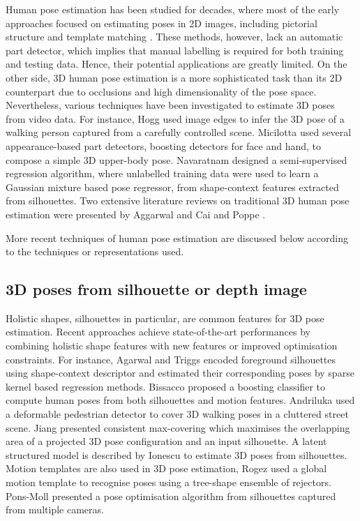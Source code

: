 Human pose estimation has been studied for decades, where most of the early approaches focused on estimating poses in 2D images, including pictorial structure \cite{Fischler1973} and template matching \cite{Ioffe1999}. These methods, however, lack an automatic part detector, which implies that manual labelling is required for both training and testing data. Hence, their potential applications are greatly limited.
On the other side, 3D human pose estimation is a more sophisticated task than its 2D counterpart due to occlusions and high dimensionality of the pose space. Nevertheless, various techniques have been investigated to estimate 3D poses from video data. For instance, Hogg \cite{Hogg1983} used image edges to infer the 3D pose of a walking person captured from a carefully controlled scene. 
Micilotta \etal \cite{Micilotta2006} used several appearance-based part detectors, \eg boosting detectors for face and hand, to compose a simple 3D upper-body pose. 
Navaratnam \etal \cite{Navaratnam2006} designed a semi-supervised regression algorithm, where unlabelled training data were used to learn a Gaussian mixture based pose regressor, from shape-context features extracted from silhouettes. Two extensive literature reviews on traditional 3D human pose estimation were presented by Aggarwal and Cai \cite{Aggarwal1999} and Poppe \cite{Poppe2007}. 

More recent techniques of human pose estimation are discussed below according to the techniques or representations used.

\subsection{3D poses from silhouette or depth image} 
Holistic shapes, silhouettes in particular, are common features for 3D pose estimation. 
Recent approaches achieve state-of-the-art performances by combining holistic shape features with new features or improved optimisation constraints. 
For instance, Agarwal and Triggs encoded foreground silhouettes using shape-context descriptor and estimated their corresponding poses by sparse kernel based regression methods.   
Bissacco \etal \cite{Bissacco2007} proposed a boosting classifier to compute human poses from both silhouettes and motion features.  
Andriluka \etal used a deformable pedestrian detector to cover 3D walking poses in a cluttered street scene.  
Jiang \etal \cite{Jiang2011} presented consistent max-covering which maximises the overlapping area of a projected 3D pose configuration and an input silhouette. 
A latent structured model is described by Ionescu \etal \cite{Ionescu2011} to estimate 3D poses from silhouettes. 
Motion templates are also used in 3D pose estimation, Rogez \etal \cite{Rogez2012} used a global motion template to recognise poses using a tree-shape ensemble of rejectors. 
Pons-Moll \etal \cite{Pons-Moll2011} presented a pose optimisation algorithm from silhouettes captured from multiple cameras. 

